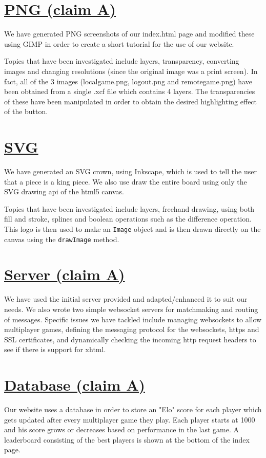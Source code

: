 \documentclass{article}
\begin{document}
\section{\underline{PNG (claim A)}}\label{sec:PNG}
    We have generated PNG screenshots of our index.html page and modified these using GIMP in order to create a short tutorial for the use of our website.

    \indent Topics that have been investigated include layers, transparency, converting images and changing resolutions (since the original image was a print screen).
    In fact, all of the 3 images (localgame.png, logout.png and remotegame.png) have been obtained from a single .xcf file which contains 4 layers. The transparencies of these
    have been manipulated in order to obtain the desired highlighting effect of the button.
\section{\underline{SVG}}\label{sec:SVG}
    We have generated an SVG crown, using Inkscape, which is used to tell the user that a piece is a king piece. We also use draw the entire board using only the SVG drawing api of the
    html5 canvas.

    \indent Topics that have been investigated include layers, freehand drawing, using both fill and stroke, splines and boolean operations such as the difference operation. This logo is
    then used to make an \verb|Image| object and is then drawn directly on the canvas using the \verb|drawImage| method.
\section{\underline{Server (claim A)}}\label{sec:Server}
    We have used the initial server provided and adapted/enhanced it to suit our needs. We also wrote two simple websocket servers for matchmaking and routing of messages.
    Specific issues we have tackled include managing websockets to allow multiplayer games, defining the messaging protocol for the websockets, https and SSL certificates,
    and dynamically checking the incoming http request headers to see if there is support for xhtml.
\section{\underline{Database (claim A)}}\label{sec:Database}
    Our website uses a database in order to store an "Elo" score for each player which gets updated after every multiplayer
    game they play. Each player starts at 1000 and his score grows or decreases based on performance in the last game. A leaderboard
    consisting of the best players is shown at the bottom of the index page.
\end{document}
